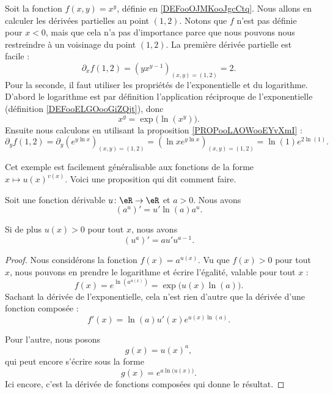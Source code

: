 	\begin{example}     \label{EXooGMRIooUucRez}
		Soit la fonction \( f(x,y)=x^y\), définie en \ref{DEFooOJMKooJgcCtq}. Nous allons en calculer les dérivées partielles au point \( (1,2)\). Notons que \( f\) n'est pas définie pour \( x<0\), mais que cela n'a pas d'importance parce que nous pouvons nous restreindre à un voisinage du point \( (1,2)\). La première dérivée partielle est facile :
		\[
			\partial_x f(1,2)=(yx^{y-1})_{(x,y)=(1,2)}=2.
		\]
		Pour la seconde, il faut utiliser les propriétés de l'exponentielle et du logarithme. D'abord le logarithme est par définition l'application réciproque de l'exponentielle (définition \ref{DEFooELGOooGiZQjt}), donc
		\begin{equation}
			x^y=\exp\big( \ln(x^y) \big).
		\end{equation}
		Ensuite nous calculons en utilisant la proposition \ref{PROPooLAOWooEYvXmI} :
		\begin{equation}
			\partial_y f(1,2)=\partial_y\left(e^{y\ln x}\right)_{(x,y)=(1,2)}=\left(\ln x e^{y\ln x}\right)_{(x,y)=(1,2)}=\ln(1) e^{2\ln(1)}.
		\end{equation}
	\end{example}


	Cet exemple est facilement généralisable aux fonctions de la forme \( x\mapsto u(x)^{v(x)}\). Voici une proposition qui dit comment faire.
	\begin{proposition}     \label{PROPooKUULooKSEULJ}
		Soit une fonction dérivable \( u\colon \eR\to \eR\) et \( a>0\). Nous avons
		\begin{equation}
			\left( a^u\right)'=u'\ln(a)a^u.
		\end{equation}

		Si de plus \( u(x)>0\) pour tout \( x\), nous avons
		\begin{equation}
			\left( u^a \right)'=au'u^{a-1}.
		\end{equation}
	\end{proposition}

	\begin{proof}
		Nous considérons la fonction \( f(x)= a^{u(x)}\). Vu que \( f(x)>0\) pour tout \( x\), nous pouvons en prendre le logarithme et écrire l'égalité, valable pour tout \( x\) :
		\begin{equation}
			f(x)= e^{\ln(a^{u(x)})}=\exp\big( u(x)\ln(a) \big).
		\end{equation}
		Sachant la dérivée de l'exponentielle, cela n'est rien d'autre que la dérivée d'une fonction composée :
		\begin{equation}
			f'(x)=\ln(a) u'(x) e^{u(x)\ln(a)}.
		\end{equation}

		Pour l'autre, nous posons
		\begin{equation}
			g(x)=u(x)^a,
		\end{equation}
		qui peut encore s'écrire sous la forme
		\begin{equation}
			g(x)= e^{a\ln\big( u(x) \big)}.
		\end{equation}
		Ici encore, c'est la dérivée de fonctions composées qui donne le résultat.
	\end{proof}

